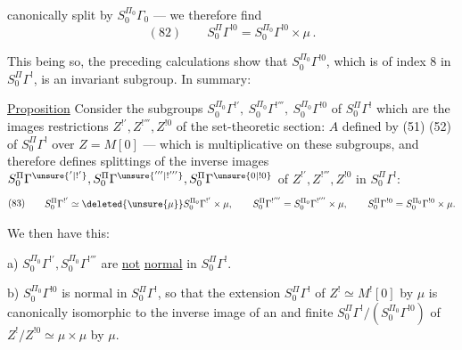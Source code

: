 

canonically split by $S_0^{\Pi_0}\Gamma_0$ --- we therefore find
\[
(82)\qquad
S_0^{\Pi}\Gamma^{!0}=S_0^{\Pi_0}\Gamma^{!0}\times\mu\,.
\]

This being so, the preceding calculations show that
$S_0^{\Pi_0}\Gamma^{!0}$, which is of index $8$ in
$S_0^{\Pi}\Gamma^!$, is an invariant subgroup. In summary:

\uline{Proposition} Consider the subgroups
$S_0^{\Pi_0}\Gamma^{!'},\ S_0^{\Pi_0}\Gamma^{!'''},\
S_0^{\Pi_0}\Gamma^{!0}$ of $S_0^{\Pi}\Gamma^!$ which are the images
\unsure{of the|of their} \inserted{homomorphic} restrictions
$Z^{!'},Z^{!'''},Z^{!0}$ of the set-theoretic section:
$A$ defined by (51) (52) of $S_0^{\Pi}\Gamma^!$ over
$Z=M[0]$ --- which is multiplicative on these subgroups,
and therefore defines splittings of the inverse images
$S_0^{\Pi}\Gamma^{\unsure{'|!'}},
S_0^{\Pi}\Gamma^{\unsure{'''|!'''}},
S_0^{\Pi}\Gamma^{\unsure{0|!0}}$
of 
$Z^{!'},Z^{!'''},Z^{!0}$ in $S_0^{\Pi}\Gamma^!$:
\[
(83)\qquad
\begin{gathered}
S_0^{\Pi}\Gamma^{!'}\simeq
\deleted{\unsure{\mu}}S_0^{\Pi_0}\Gamma^{!'}\times\mu,\qquad
S_0^{\Pi}\Gamma^{!'''}=S_0^{\Pi_0}\Gamma^{!'''}\times\mu,\qquad
S_0^{\Pi}\Gamma^{!0}=S_0^{\Pi_0}\Gamma^{!0}\times\mu.
\end{gathered}
\]


We then have this:

a) $S_0^{\Pi_0}\Gamma^{!'},S_0^{\Pi_0}\Gamma^{!'''}$ are
\uline{not} \uline{normal} in $S_0^{\Pi}\Gamma^!$.

b) $S_0^{\Pi_0}\Gamma^{!0}$ is normal in
$S_0^{\Pi}\Gamma^!$, so that the extension
$S_0^{\Pi}\Gamma^!$ of $Z^!\simeq M^![0]$ by $\mu$
is canonically isomorphic to the inverse image of an
  and finite
$S_0^{\Pi}\Gamma^!/(S_0^{\Pi_0}\Gamma^{!0})$
of $Z^!/Z^{!0}\simeq\mu\times\mu$ by $\mu$.

